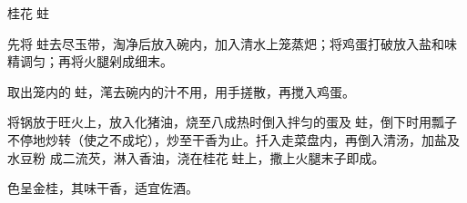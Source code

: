 %
%
%
%
%
%
%
\begin{recipe}{桂花𧎼蛀}

\ingredients


\preparation

\step 先将𧎼蛀去尽玉带，淘净后放入碗内，加入清水上笼蒸𤆵；将鸡蛋打破放入盐和味
精调匀；再将火腿剁成细末。

\step 取出笼内的𧎼蛀，滗去碗内的汁不用，用手搓散，再搅入鸡蛋。

\step 将锅放于旺火上，放入化猪油，烧至八成热时倒入拌匀的蛋及𧎼蛀，倒下时用瓢子
不停地炒转（使之不成坨），炒至干香为止。扦入走菜盘内，再倒入清汤，加盐及水豆粉
成二流芡，淋入香油，浇在桂花𧎼蛀上，撒上火腿末子即成。

\features

色呈金桂，其味干香，适宜佐酒。

\end{recipe}

